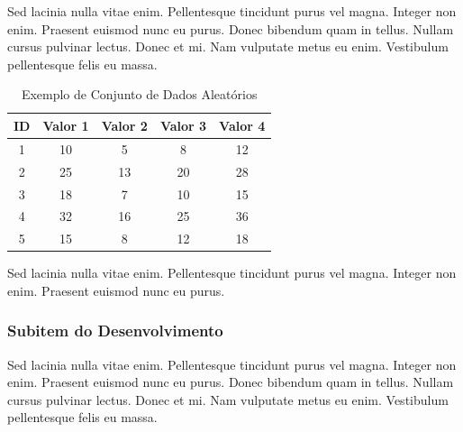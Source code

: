 Sed lacinia nulla vitae enim. Pellentesque tincidunt purus vel magna.
Integer non enim. Praesent euismod nunc eu purus. Donec bibendum quam in tellus.
Nullam cursus pulvinar lectus. Donec et mi. Nam vulputate metus eu enim. Vestibulum
pellentesque felis eu massa. \\



\begin{table}[htbp]
    \centering
    \caption{Exemplo de Conjunto de Dados Aleatórios}
    \begin{tabular}{c c c c c}
    \toprule
    \textbf{ID} & \textbf{Valor 1} & \textbf{Valor 2} & \textbf{Valor 3} & \textbf{Valor 4} \\
    \midrule
    1 & 10 & 5 & 8 & 12 \\
    2 & 25 & 13 & 20 & 28 \\
    3 & 18 & 7 & 10 & 15 \\
    4 & 32 & 16 & 25 & 36 \\
    5 & 15 & 8 & 12 & 18 \\
    \bottomrule
    \end{tabular}
\end{table}

Sed lacinia nulla vitae enim. Pellentesque tincidunt purus vel magna.
Integer non enim. Praesent euismod nunc eu purus.

\subsubsection{Subitem do Desenvolvimento}

Sed lacinia nulla vitae enim. Pellentesque tincidunt purus vel magna.
Integer non enim. Praesent euismod nunc eu purus. Donec bibendum quam in tellus.
Nullam cursus pulvinar lectus. Donec et mi. Nam vulputate metus eu enim. Vestibulum
pellentesque felis eu massa. \\

